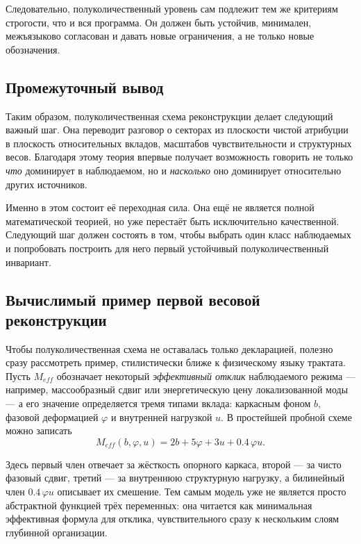 \documentclass[12pt,a4paper]{article}
\begin{document}
Следовательно, полуколичественный уровень сам подлежит тем же критериям строгости, что и вся программа. Он должен быть устойчив, минимален, межъязыково согласован и давать новые ограничения, а не только новые обозначения.

\subsection{Промежуточный вывод}

Таким образом, полуколичественная схема реконструкции делает следующий важный шаг. Она переводит разговор о секторах из плоскости чистой атрибуции в плоскость относительных вкладов, масштабов чувствительности и структурных весов. Благодаря этому теория впервые получает возможность говорить не только \textit{что} доминирует в наблюдаемом, но и \textit{насколько} оно доминирует относительно других источников.

Именно в этом состоит её переходная сила. Она ещё не является полной математической теорией, но уже перестаёт быть исключительно качественной. Следующий шаг должен состоять в том, чтобы выбрать один класс наблюдаемых и попробовать построить для него первый устойчивый полуколичественный инвариант.

\subsection{Вычислимый пример первой весовой реконструкции}

Чтобы полуколичественная схема не оставалась только декларацией, полезно сразу рассмотреть пример, стилистически ближе к физическому языку трактата. Пусть \(M_{eff}\) обозначает некоторый \textit{эффективный отклик} наблюдаемого режима --- например, массообразный сдвиг или энергетическую цену локализованной моды --- а его значение определяется тремя типами вклада: каркасным фоном \(b\), фазовой деформацией \(\varphi\) и внутренней нагрузкой \(u\). В простейшей пробной схеме можно записать
\begin{equation}
M_{eff}(b,\varphi,u)=2b+5\varphi+3u+0.4\,\varphi u.
\end{equation}

Здесь первый член отвечает за жёсткость опорного каркаса, второй --- за чисто фазовый сдвиг, третий --- за внутреннюю структурную нагрузку, а билинейный член \(0.4\,\varphi u\) описывает их смешение. Тем самым модель уже не является просто абстрактной функцией трёх переменных: она читается как минимальная эффективная формула для отклика, чувствительного сразу к нескольким слоям глубинной организации.
\end{document}
